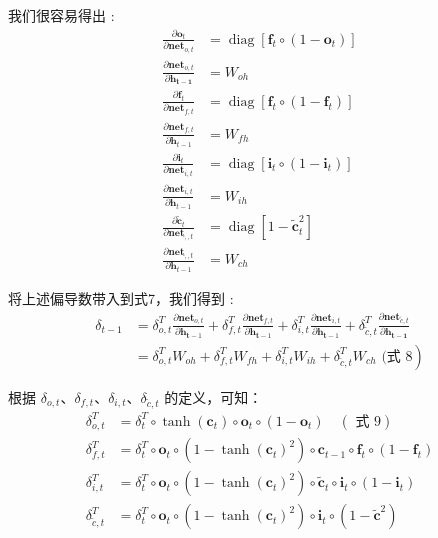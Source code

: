\documentclass[10.5pt,compsoc]{CjC}
\theoremstyle{mystyle}
\begin{document}
我们很容易得出 :
$$
\begin{aligned}
\frac{\partial \mathbf{o}_{t}}{\partial \mathbf{n e t}_{o, t}} &=\operatorname{diag}\left[\mathbf{f}_{t} \circ\left(1-\mathbf{o}_{t}\right)\right]\\
\frac{\partial \mathbf{n e t}_{o, t}}{\partial \mathbf{h}_{\mathbf{t}-\mathbf{1}}} &=W_{o h} \\
\frac{\partial \mathbf{f}_{t}}{\partial \mathbf{n e t}_{f, t}} &=\operatorname{diag}\left[\mathbf{f}_{t} \circ\left(1-\mathbf{f}_{t}\right)\right] \\
\frac{\partial \mathbf{n e t}_{f, t}}{\partial \mathbf{h}_{t-1}} &=W_{f h} \\
\frac{\partial \mathbf{i}_{t}}{\partial \mathbf{n e t}_{i, t}} &=\operatorname{diag}\left[\mathbf{i}_{t} \circ\left(1-\mathbf{i}_{t}\right)\right] \\
\frac{\partial \mathbf{n e t}_{i, t}}{\partial \mathbf{h}_{t-1}} &=W_{i h} \\
\frac{\partial \tilde{\mathbf{c}}_{t}}{\partial \mathbf{n e t}_{\tilde{,}, t}} &=\operatorname{diag}\left[1-\tilde{\mathbf{c}}_{t}^{2}\right] \\
\frac{\partial \mathbf{n e t}_{\tilde{,}, t}}{\partial \mathbf{h}_{t-1}} &=W_{c h}
\end{aligned}
$$

将上述偏导数带入到式7，我们得到 :
$$
\begin{aligned}
\delta_{t-1} &=\delta_{o, t}^{T} \frac{\partial \mathbf{n e t}_{o, t}}{\partial \mathbf{h}_{\mathbf{t}-1}}+\delta_{f, t}^{T} \frac{\partial \mathbf{n e t}_{f, t}}{\partial \mathbf{h}_{\mathbf{t}-1}}+\delta_{i, t}^{T} \frac{\partial \mathbf{n e t}_{i, t}}{\partial \mathbf{h}_{\mathbf{t}-1}}+\delta_{\tilde{c}, t}^{T} \frac{\partial \mathbf{n e t}_{\tilde{c}, t}}{\partial \mathbf{h}_{\mathbf{t}-\mathbf{1}}} \\
&\left.=\delta_{o, t}^{T} W_{o h}+\delta_{f, t}^{T} W_{f h}+\delta_{i, t}^{T} W_{i h}+\delta_{\tilde{c}, t}^{T} W_{c h} \text { (式 } 8\right)
\end{aligned}
$$

根据 $\delta_{o, t} 、 \delta_{f, t} 、 \delta_{i, t} 、 \delta_{\tilde{c}, t}$ 的定义，可知：
$$
\begin{aligned}
\delta_{o, t}^{T} &=\delta_{t}^{T} \circ \tanh \left(\mathbf{c}_{t}\right) \circ \mathbf{o}_{t} \circ\left(1-\mathbf{o}_{t}\right) \quad(\text { 式 } 9) \\
\delta_{f, t}^{T} &=\delta_{t}^{T} \circ \mathbf{o}_{t} \circ\left(1-\tanh \left(\mathbf{c}_{t}\right)^{2}\right) \circ \mathbf{c}_{t-1} \circ \mathbf{f}_{t} \circ\left(1-\mathbf{f}_{t}\right) \\
\delta_{i, t}^{T} &=\delta_{t}^{T} \circ \mathbf{o}_{t} \circ\left(1-\tanh \left(\mathbf{c}_{t}\right)^{2}\right) \circ \tilde{\mathbf{c}}_{t} \circ \mathbf{i}_{t} \circ\left(1-\mathbf{i}_{t}\right) \\
\delta_{\tilde{c}, t}^{T} &=\delta_{t}^{T} \circ \mathbf{o}_{t} \circ\left(1-\tanh \left(\mathbf{c}_{t}\right)^{2}\right) \circ \mathbf{i}_{t} \circ\left(1-\tilde{\mathbf{c}}^{2}\right)
\end{aligned}
$$
\end{document}
